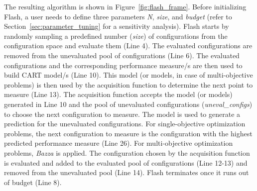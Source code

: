 \documentclass[10pt,journal,compsoc]{IEEEtran}
\newcommand{\flash}{{\sc Flash}\xspace}
\begin{document}
The resulting algorithm is shown in  Figure~\ref{fig:flash_frame}. 
Before initializing \flash, a user needs to define three parameters \textit{N}, \textit{size}, and \textit{budget} (refer to Section~\ref{sec:parameter_tuning} for a sensitivity analysis). \flash starts by randomly sampling a predefined number (\textit{size}) of configurations from the configuration space and evaluate them (Line 4). The evaluated configurations are removed from the unevaluated pool of configurations (Line 6). The evaluated configurations and the corresponding performance measure/s are then used to build CART model/s (Line 10). This model (or models, in case of multi-objective problems) is then used by the acquisition function to determine the next point to measure (Line 13). The acquisition function accepts the model (or models) generated in Line 10 and the pool of unevaluated configurations (\textit{uneval\_configs}) to choose the next configuration to measure. The model is used to generate a prediction for the unevaluated configurations. 
For single-objective optimization problems, the next configuration to measure is the configuration with the highest predicted performance measure (Line 26). For multi-objective optimization problems, 
{\em Bazza} is applied. The configuration chosen by the acquisition function is evaluated and added to the evaluated pool of configurations (Line 12-13) and removed from the unevaluated pool (Line 14). \flash terminates once it runs out of budget (Line 8). 




\end{document}

